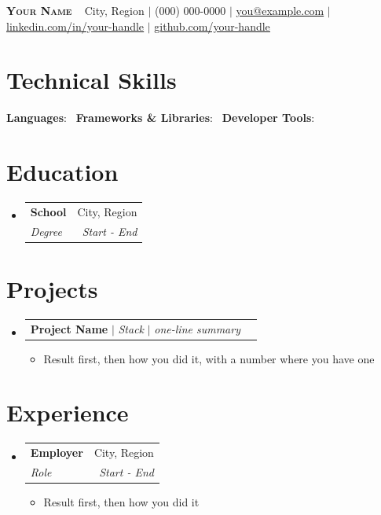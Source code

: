 \documentclass[letterpaper,10pt]{article}
\makeatletter
\newcommand{\resumeItem}[1]{\item\small{{#1 \vspace{-3pt}}}}
\newcommand{\resumeSubheading}[4]{
  \vspace{-2pt}\item
    \begin{tabular*}{0.97\textwidth}[t]{l@{\extracolsep{\fill}}r}
      \textbf{#1} & #2 \\
      \textit{\small#3} & \textit{\small #4} \\
    \end{tabular*}\vspace{-7pt}
}
\newcommand{\resumeProjectHeading}[1]{
    \item
    \begin{tabular*}{0.97\textwidth}{l@{\extracolsep{\fill}}r}
      \small#1 & \\
    \end{tabular*}\vspace{-7pt}
}
\newcommand{\resumeSubHeadingListStart}{\begin{itemize}[leftmargin=0.15in, label={}]}
\newcommand{\resumeSubHeadingListEnd}{\end{itemize}}
\newcommand{\resumeItemListStart}{\begin{itemize}[leftmargin=0.3in]}
\newcommand{\resumeItemListEnd}{\end{itemize}\vspace{-5pt}}
\makeatother
\begin{document}
\begin{center}
    \textbf{\Huge \scshape Your Name} \ \vspace{1pt}
    \small City, Region $|$ (000) 000-0000 $|$ \href{mailto:you@example.com}{\underline{you@example.com}} $|$
    \href{https://linkedin.com/in/your-handle}{\underline{linkedin.com/in/your-handle}} $|$
    \href{https://github.com/your-handle}{\underline{github.com/your-handle}}
\end{center}

\section{Technical Skills}
 \begin{itemize}[leftmargin=0.15in, label={}]
    \small{\item{
     \textbf{Languages}{: } \
     \textbf{Frameworks \& Libraries}{: } \
     \textbf{Developer Tools}{: }
    }}
 \end{itemize}

\section{Education}
  \resumeSubHeadingListStart
    \resumeSubheading
      {School}{City, Region}
      {Degree}{Start - End}
  \resumeSubHeadingListEnd

\section{Projects}
    \resumeSubHeadingListStart
      \resumeProjectHeading
          {\textbf{Project Name} $|$ \emph{Stack} $|$ \emph{one-line summary}}
          \resumeItemListStart
            \resumeItem{Result first, then how you did it, with a number where you have one}
          \resumeItemListEnd
    \resumeSubHeadingListEnd

\section{Experience}
  \resumeSubHeadingListStart
    \resumeSubheading
      {Employer}{City, Region}
      {Role}{Start - End}
      \resumeItemListStart
        \resumeItem{Result first, then how you did it}
      \resumeItemListEnd
  \resumeSubHeadingListEnd
\end{document}
